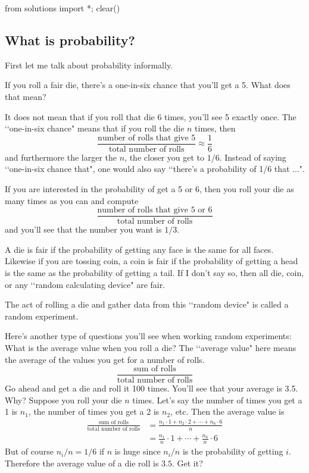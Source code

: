 \begin{python0}
from solutions import *; clear()
\end{python0}

\subsection{What is probability?}

First let me talk about probability informally.

If you roll a fair die, there's a one-in-six chance that you'll get a 5.
What does that mean?

It does not mean that if you roll that die 6 times,
you'll see 5 exactly once.
The \lq\lq one-in-six chance" means that if you roll
the die $n$ times, then
\[
\frac{\text{number of rolls that give 5}}{\text{total number of rolls}}
\approx \frac{1}{6}
\]
and furthermore the larger the $n$, the closer you get to $1/6$.
Instead of saying \lq\lq one-in-six chance that", one would also say
\lq\lq there's a probability of 1/6 that ...".

If you are interested in the probability of get a 5 or 6, then
you roll your die as many times as you can and compute
\[
\frac{\text{number of rolls that give 5 or 6}}{\text{total number of rolls}}
\]
and you'll see that the number you want is $1/3$.

A die is fair if the probability of getting any face is the same for all
faces.
Likewise if you are tossing coin, a coin is fair if the probability of
getting a head is the same as the probability of getting a tail.
If I don't say so, then all die, coin, or any \lq\lq random calculating
device" are fair.

The act of rolling a die and gather data from this
\lq\lq random device" is called a random experiment.

Here's another type of questions you'll see when working random experiments:
What is the average value when you roll a die?
The \lq\lq average value" here
means the average of the values you get for a number of rolls.
\[
\frac{\text{sum of rolls}}{\text{total number of rolls}}
\]
Go ahead and get a die and roll it 100 times.
You'll see that your average is 3.5.
Why?
Suppose you roll your die $n$ times.
Let's say
the number of times you get a 1 is $n_1$,
the number of times you get a 2 is $n_2$,
etc.
Then the average value is
\begin{align*}
  \frac{\text{sum of rolls}}{\text{total number of rolls}}
  &= \frac{
    n_1 \cdot 1
    +
    n_2 \cdot 2
    +
    \cdots
    +
    n_6 \cdot 6
  }{n}
  \\
  &= \frac{n_1}{n} \cdot 1
  + \cdots + 
  \frac{n_6}{n} \cdot 6
\end{align*}
But of course $n_i/n = 1/6$ if $n$ is huge since $n_i/n$ is the
probability of getting $i$.
Therefore the average value of a die roll is $3.5$.
Get it?

